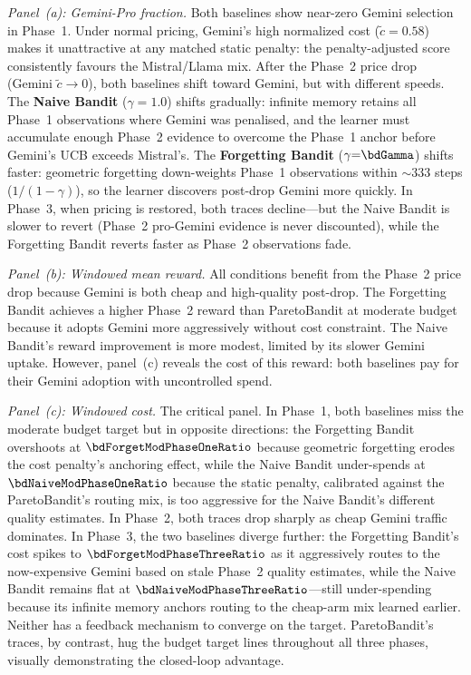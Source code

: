 \emph{Panel~(a): Gemini-Pro fraction.}
Both baselines show near-zero Gemini selection in Phase~1.  Under
normal pricing, Gemini's high normalized cost ($\tilde{c}{=}0.58$)
makes it unattractive at any matched static penalty: the
penalty-adjusted score consistently favours the Mistral/Llama mix.
After the Phase~2 price drop (Gemini $\tilde{c}\to 0$), both
baselines shift toward Gemini, but with different speeds.
The \textbf{Naive Bandit} ($\gamma{=}1.0$) shifts gradually:
infinite memory retains all Phase~1 observations where Gemini was
penalised, and the learner must accumulate enough Phase~2 evidence
to overcome the Phase~1 anchor before Gemini's UCB exceeds
Mistral's.
The \textbf{Forgetting Bandit} ($\gamma{=}\bdGamma$) shifts faster:
geometric forgetting down-weights Phase~1 observations within
${\sim}333$ steps ($1/(1{-}\gamma)$), so the learner discovers post-drop Gemini more
quickly.
In Phase~3, when pricing is restored, both traces decline---but
the Naive Bandit is slower to revert (Phase~2 pro-Gemini evidence
is never discounted), while the Forgetting Bandit reverts faster
as Phase~2 observations fade.

\emph{Panel~(b): Windowed mean reward.}
All conditions benefit from the Phase~2 price drop because Gemini
is both cheap and high-quality post-drop.  The Forgetting Bandit
achieves a higher Phase~2 reward than ParetoBandit at moderate
budget because it adopts Gemini more aggressively without cost
constraint.  The Naive Bandit's reward improvement is more modest,
limited by its slower Gemini uptake.
However, panel~(c) reveals the cost of this reward: both baselines
pay for their Gemini adoption with uncontrolled spend.

\emph{Panel~(c): Windowed cost.}
The critical panel.  In Phase~1, both baselines miss the moderate
budget target but in opposite directions: the Forgetting Bandit
overshoots at $\bdForgetModPhaseOneRatio$ because geometric forgetting
erodes the cost penalty's anchoring effect, while the Naive Bandit
under-spends at $\bdNaiveModPhaseOneRatio$ because the static penalty,
calibrated against the ParetoBandit's routing mix, is too aggressive
for the Naive Bandit's different quality estimates.
In Phase~2, both traces drop sharply as cheap Gemini traffic
dominates.
In Phase~3, the two baselines diverge further: the Forgetting
Bandit's cost spikes to $\bdForgetModPhaseThreeRatio$ as it
aggressively routes to the now-expensive Gemini based on stale
Phase~2 quality estimates, while the Naive Bandit remains flat at
$\bdNaiveModPhaseThreeRatio$---still under-spending because its
infinite memory anchors routing to the cheap-arm mix learned earlier.
Neither has a feedback mechanism to converge on the target.
ParetoBandit's traces, by contrast, hug the budget target lines
throughout all three phases, visually demonstrating the closed-loop
advantage.

